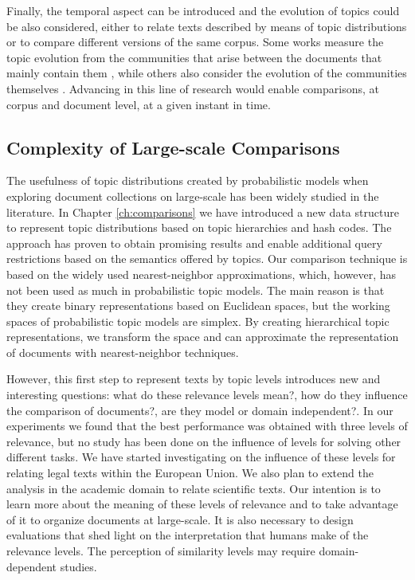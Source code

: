 Finally, the temporal aspect can be introduced and the evolution of topics could be also considered, either to relate texts described by means of topic distributions or to compare different versions of the same corpus. Some works measure the topic evolution from the communities that arise between the documents that mainly contain them \citep{Gruhl2004, Li2010, Kleinberg1999}, while others also consider the evolution of the communities themselves \citep{Li2012, Nguyen2014DynamicSC, Leydesdorff2012StatisticsFT, prabhakaran-etal-2016-predicting, Zijun2018}. Advancing in this line of research would enable comparisons, at corpus and document level, at a given instant in time. 



\subsection{Complexity of Large-scale Comparisons} 

The usefulness of topic distributions created by probabilistic models when exploring document collections on large-scale has been widely studied in the literature. In Chapter \ref{ch:comparisons} we have introduced a new data structure to represent topic distributions based on topic hierarchies and hash codes. The approach has proven to obtain promising results and enable additional query restrictions based on the semantics offered by topics. Our comparison technique is based on the widely used nearest-neighbor approximations, which, however, has not been used as much in probabilistic topic models. The main reason is that they 
create binary representations based on Euclidean spaces, but the working spaces of probabilistic topic models are simplex. By creating hierarchical topic representations, we transform the space and can approximate the representation of documents with nearest-neighbor techniques.

However, this first step to represent texts by topic levels introduces new and interesting questions: what do these relevance levels mean?, how do they influence the comparison of documents?, are they model or domain independent?. In our experiments we found that the best performance was obtained with three levels of relevance, but no study has been done on the influence of levels for solving other different tasks. We have started investigating on the influence of these levels for relating legal texts within the European Union. We also plan to extend the analysis in the academic domain to relate scientific texts. Our intention is to learn more about the meaning of these levels of relevance and to take advantage of it to organize documents at large-scale. It is also necessary to design evaluations that shed light on the interpretation that humans make of the relevance levels. The perception of similarity levels may require domain-dependent studies.



